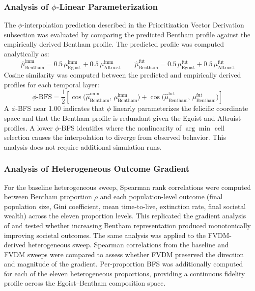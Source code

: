 \documentclass{icsthesis}
\begin{document}
\begin{mainmatter}
\subsubsection{Analysis of $\phi$-Linear Parameterization}
The $\phi$-interpolation prediction described in the Prioritization Vector Derivation subsection was evaluated by comparing the predicted Bentham profile against the empirically derived Bentham profile. The predicted profile was computed analytically as:
\[
\hat{\mu}^{\mathrm{imm}}_{\mathrm{Bentham}} = 0.5\,\mu^{\mathrm{imm}}_{\mathrm{Egoist}} + 0.5\,\mu^{\mathrm{imm}}_{\mathrm{Altruist}}
\qquad
\hat{\mu}^{\mathrm{fut}}_{\mathrm{Bentham}} = 0.5\,\mu^{\mathrm{fut}}_{\mathrm{Egoist}} + 0.5\,\mu^{\mathrm{fut}}_{\mathrm{Altruist}}
\]
Cosine similarity was computed between the predicted and empirically derived profiles for each temporal layer:
\[
\phi\text{-BFS} = \frac{1}{2}\!\left[
  \cos\!\bigl(\hat{\mu}^{\mathrm{imm}}_{\mathrm{Bentham}},\, \mu^{\mathrm{imm}}_{\mathrm{Bentham}}\bigr)
  +
  \cos\!\bigl(\hat{\mu}^{\mathrm{fut}}_{\mathrm{Bentham}},\, \mu^{\mathrm{fut}}_{\mathrm{Bentham}}\bigr)
\right]
\]
A $\phi$-BFS near 1.00 indicates that $\phi$ linearly parameterizes the felicific coordinate space and that the Bentham profile is redundant given the Egoist and Altruist profiles. A lower $\phi$-BFS identifies where the nonlinearity of $\arg\min$ cell selection causes the interpolation to diverge from observed behavior. This analysis does not require additional simulation runs.

\subsubsection{Analysis of Heterogeneous Outcome Gradient}
For the baseline heterogeneous sweep, Spearman rank correlations were computed between Bentham proportion $\rho$ and each population-level outcome (final population size, Gini coefficient, mean time-to-live, extinction rate, final societal wealth) across the eleven proportion levels. This replicated the gradient analysis of \citet{KremerHerman2024b} and tested whether increasing Bentham representation produced monotonically improving societal outcomes. The same analysis was applied to the FVDM-derived heterogeneous sweep. Spearman correlations from the baseline and FVDM sweeps were compared to assess whether FVDM preserved the direction and magnitude of the gradient. Per-proportion BFS was additionally computed for each of the eleven heterogeneous proportions, providing a continuous fidelity profile across the Egoist--Bentham composition space.


\end{mainmatter}
\end{document}
